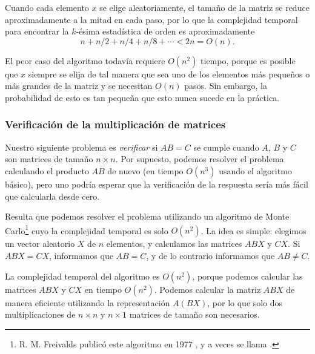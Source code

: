Cuando cada elemento $x$ se elige aleatoriamente,
el tamaño de la matriz se reduce aproximadamente a la mitad en cada paso,
por lo que la complejidad temporal para
encontrar la $k$-ésima estadística de orden es aproximadamente
\[n+n/2+n/4+n/8+\cdots < 2n = O(n).\]

El peor caso del algoritmo todavía requiere $O(n^2)$ tiempo,
porque es posible que $x$ siempre se elija
de tal manera que sea uno de los elementos más pequeños o más grandes
de la matriz y se necesitan $O(n)$ pasos.
Sin embargo, la probabilidad de esto es tan pequeña
que esto nunca sucede en la práctica.

\subsubsection{Verificación de la multiplicación de matrices}


Nuestro siguiente problema es \emph{verificar}
si $AB=C$ se cumple cuando $A$, $B$ y $C$
son matrices de tamaño $n \times n$.
Por supuesto, podemos resolver el problema
calculando el producto $AB$ de nuevo
(en tiempo $O(n^3)$ usando el algoritmo básico),
pero uno podría esperar que la verificación de la
respuesta sería más fácil que calcularla desde cero.

Resulta que podemos resolver el problema
utilizando un algoritmo de Monte Carlo\footnote{R. M. Freivalds publicó
este algoritmo en 1977 \cite{fre77}, y a veces
se llama  .} cuyo
la complejidad temporal es solo $O(n^2)$.
La idea es simple: elegimos un vector aleatorio
$X$ de $n$ elementos, y calculamos las matrices
$ABX$ y $CX$. Si $ABX=CX$, informamos que $AB=C$,
y de lo contrario informamos que $AB \neq C$.

La complejidad temporal del algoritmo es
$O(n^2)$, porque podemos calcular las matrices
$ABX$ y $CX$ en tiempo $O(n^2)$.
Podemos calcular la matriz $ABX$ de manera eficiente
utilizando la representación $A(BX)$, por lo que solo dos
multiplicaciones de $n \times n$ y $n \times 1$
matrices de tamaño son necesarios.

